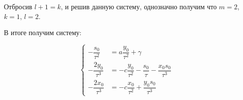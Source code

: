 Отбросив $ l + 1 = k $, и решив данную систему, однозначно получим что $ m = 2 $, $ k = 1 $, $ l = 2 $.

В итоге получим систему:

\begin{equation}
\label{eq:step1_results}
	\left\{
		\begin{aligned}
			-\dfrac{s_0}{\tau^2} &= a \dfrac{y_0}{\tau^2} + \gamma \\
			-\dfrac{2y_0}{\tau^3} &= -c \dfrac{y_0}{\tau^2} - \dfrac{s_0}{\tau} - \dfrac{x_0 s_0}{\tau^3} \\
			-\dfrac{2x_0}{\tau^{3}} &= -c \dfrac{x_0}{\tau^2} + \dfrac{y_0 s_0}{\tau^3}
		\end{aligned}
	\right.
\end{equation}
